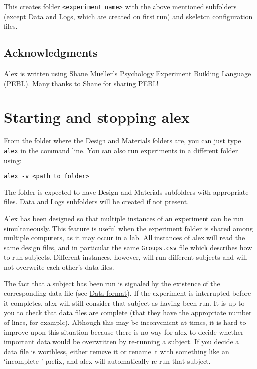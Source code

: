 \documentclass[11pt,]{article}
\begin{document}
This creates folder \texttt{\textless{}experiment name\textgreater{}}
with the above mentioned subfolders (except Data and Logs, which are
created on first run) and skeleton configuration files.

\subsection{Acknowledgments}\label{acknowledgements}

Alex is written using Shane Mueller's
\href{http://pebl.sourceforge.net}{Psychology Experiment Building
Language} (PEBL). Many thanks to Shane for sharing PEBL!

\section{Starting and stopping alex}\label{running}

From the folder where the Design and Materials folders are, you can just
type \texttt{alex} in the command line. You can also run experiments in
a different folder using:

\begin{verbatim}
alex -v <path to folder>
\end{verbatim}

The folder is expected to have Design and Materials subfolders with
appropriate files. Data and Logs subfolders will be created if not
present.

Alex has been designed so that multiple instances of an experiment can
be run simultaneously. This feature is useful when the experiment folder
is shared among multiple computers, as it may occur in a lab. All
instances of alex will read the same design files, and in particular the
same \texttt{Groups.csv} file which describes how to run subjects.
Different instances, however, will run different subjects and will not
overwrite each other's data files.

The fact that a subject has been run is signaled by the existence of the
corresponding data file (see \hyperref[data-format]{Data format}). If
the experiment is interrupted before it completes, alex will still
consider that subject as having been run. It is up to you to check that
data files are complete (that they have the appropriate number of lines,
for example). Although this may be inconvenient at times, it is hard to
improve upon this situation because there is no way for alex to decide
whether important data would be overwritten by re-running a subject. If
you decide a data file is worthless, either remove it or rename it with
something like an `incomplete-' prefix, and alex will automatically
re-run that subject.
\end{document}
